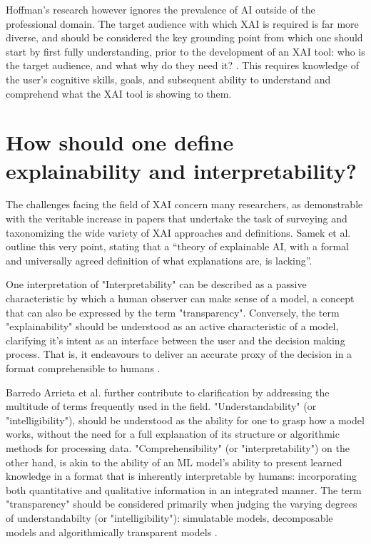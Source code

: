 Hoffman's research however ignores the prevalence of AI outside of the professional domain. The target audience with which XAI is required is far more diverse, and should be considered the key grounding point from which one should start by first fully understanding, prior to the development of an XAI tool: who is the target audience, and what why do they need it? \cite{barredoarrietaExplainableArtificialIntelligence2020}. This requires knowledge of the user’s cognitive skills, goals, and subsequent ability to understand and comprehend what the XAI tool is showing to them.

\section{How should one define explainability and interpretability?}

The challenges facing the field of XAI concern many researchers, as demonstrable with the veritable increase in papers that undertake the task of surveying and taxonomizing the wide variety of XAI approaches and definitions. Samek et al. \cite{samekExplainableAIInterpreting2019} outline this very point, stating that a “theory of explainable AI, with a formal and universally agreed definition of what explanations are, is lacking”. 

One interpretation of "Interpretability" can be described as a passive characteristic by which a human observer can make sense of a model, a concept that can also be expressed by the term "transparency". Conversely, the term "explainability" should be understood as an active characteristic of a model, clarifying it’s intent as an interface between the user and the decision making process. That is, it endeavours to deliver an accurate proxy of the decision in a format comprehensible to humans \cite{guidottiSurveyMethodsExplaining2019}. 

Barredo Arrieta et al. \cite{barredoarrietaExplainableArtificialIntelligence2020} further contribute to clarification by addressing the multitude of terms frequently used in the field. "Understandability" (or "intelligibility"), should be understood as the ability for one to grasp how a model works, without the need for a full explanation of its structure or algorithmic methods for processing data. "Comprehensibility" (or "interpretability") on the other hand, is akin to the ability of an ML model's ability to present learned knowledge in a format that is inherently interpretable by humans: incorporating both quantitative and qualitative information in an integrated manner. The term "transparency" should be considered primarily when judging the varying degrees of understandabilty (or "intelligibility"): simulatable models, decomposable models and algorithmically transparent models \cite{liptonMythosModelInterpretability2016}.

